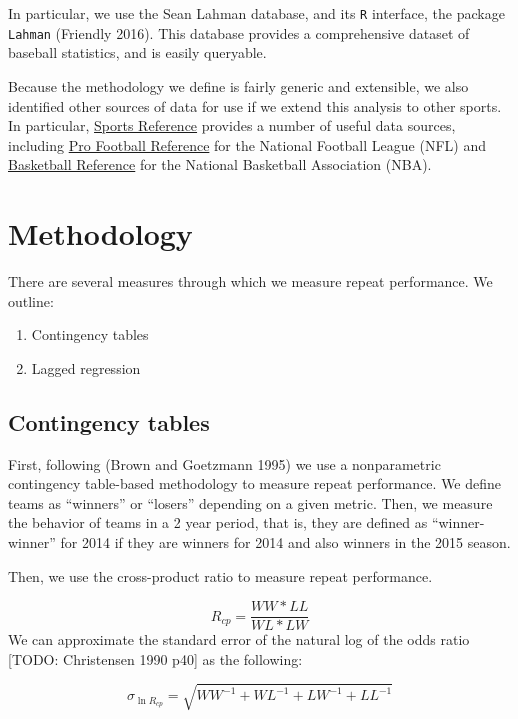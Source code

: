 \documentclass[11pt,]{scrartcl}
\providecommand{\tightlist}{%
  \setlength{\itemsep}{0pt}\setlength{\parskip}{0pt}}
\begin{document}
In particular, we use the Sean Lahman database, and its \texttt{R}
interface, the package \texttt{Lahman} (Friendly 2016). This database
provides a comprehensive dataset of baseball statistics, and is easily
queryable.

Because the methodology we define is fairly generic and extensible, we
also identified other sources of data for use if we extend this analysis
to other sports. In particular,
\href{http://www.sports-reference.com/}{Sports Reference} provides a
number of useful data sources, including
\href{http://www.pro-football-reference.com/}{Pro Football Reference}
for the National Football League (NFL) and
\href{http://www.basketball-reference.com/}{Basketball Reference} for
the National Basketball Association (NBA).

\section{Methodology}\label{methodology}

There are several measures through which we measure repeat performance.
We outline:

\begin{enumerate}
\def\labelenumi{\arabic{enumi}.}
\tightlist
\item
  Contingency tables
\item
  Lagged regression
\end{enumerate}

\subsection{Contingency tables}\label{contingency-tables}

First, following (Brown and Goetzmann 1995) we use a nonparametric
contingency table-based methodology to measure repeat performance. We
define teams as ``winners'' or ``losers'' depending on a given metric.
Then, we measure the behavior of teams in a 2 year period, that is, they
are defined as ``winner-winner'' for 2014 if they are winners for 2014
and also winners in the 2015 season.

Then, we use the cross-product ratio to measure repeat performance.

\[R_{cp} = \frac{WW * LL}{WL*LW} \] We can approximate the standard
error of the natural log of the odds ratio {[}TODO: Christensen 1990
p40{]} as the following:

\[\sigma_{\ln R_{cp}} = \sqrt{WW^{-1} + WL^{-1} + LW^{-1} + LL^{-1}}\]
\end{document}
